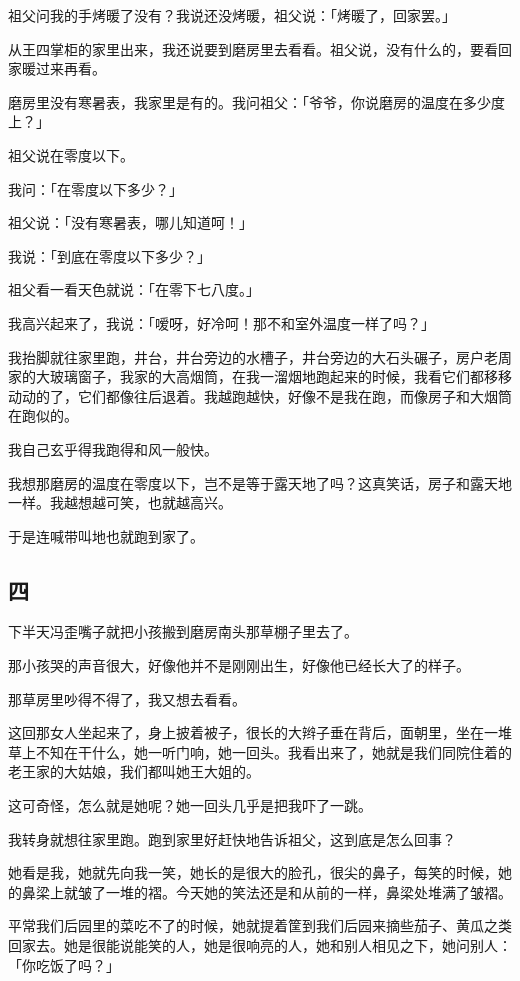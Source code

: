 \documentclass[UTF8]{ctexart}
\begin{document}
祖父问我的手烤暖了没有？我说还没烤暖，祖父说：「烤暖了，回家罢。」

从王四掌柜的家里出来，我还说要到磨房里去看看。祖父说，没有什么的，要看回家暖过来再看。

磨房里没有寒暑表，我家里是有的。我问祖父：「爷爷，你说磨房的温度在多少度上？」

祖父说在零度以下。

我问：「在零度以下多少？」

祖父说：「没有寒暑表，哪儿知道呵！」

我说：「到底在零度以下多少？」

祖父看一看天色就说：「在零下七八度。」

我高兴起来了，我说：「嗳呀，好冷呵！那不和室外温度一样了吗？」

我抬脚就往家里跑，井台，井台旁边的水槽子，井台旁边的大石头碾子，房户老周家的大玻璃窗子，我家的大高烟筒，在我一溜烟地跑起来的时候，我看它们都移移动动的了，它们都像往后退着。我越跑越快，好像不是我在跑，而像房子和大烟筒在跑似的。

我自己玄乎得我跑得和风一般快。

我想那磨房的温度在零度以下，岂不是等于露天地了吗？这真笑话，房子和露天地一样。{我越想越可笑，也就越高兴。}

于是连喊带叫地也就跑到家了。

\subsection{四}

下半天冯歪嘴子就把小孩搬到磨房南头那草棚子里去了。

那小孩哭的声音很大，好像他并不是刚刚出生，好像他已经长大了的样子。

那草房里吵得不得了，我又想去看看。

这回那女人坐起来了，身上披着被子，很长的大辫子垂在背后，面朝里，坐在一堆草上不知在干什么，她一听门响，她一回头。我看出来了，她就是我们同院住着的老王家的大姑娘，我们都叫她王大姐的。

这可奇怪，怎么就是她呢？她一回头几乎是把我吓了一跳。

我转身就想往家里跑。跑到家里好赶快地告诉祖父，这到底是怎么回事？

她看是我，她就先向我一笑，她长的是很大的脸孔，很尖的鼻子，每笑的时候，她的鼻梁上就皱了一堆的褶。今天她的笑法还是和从前的一样，鼻梁处堆满了皱褶。

平常我们后园里的菜吃不了的时候，她就提着筐到我们后园来摘些茄子、黄瓜之类回家去。她是很能说能笑的人，她是很响亮的人，她和别人相见之下，她问别人：「你吃饭了吗？」
\end{document}
